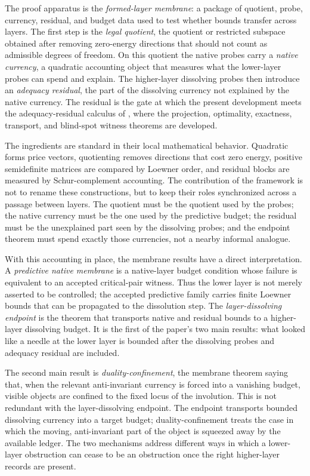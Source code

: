 \documentclass[11pt]{article}
\theoremstyle{definition}
\begin{document}
The proof apparatus is the \emph{formed-layer membrane}: a package of
quotient, probe, currency, residual, and budget data used to test
whether bounds transfer across layers.  The first step is the
\emph{legal quotient}, the quotient or restricted subspace obtained
after removing zero-energy directions that should not count as
admissible degrees of freedom.  On this quotient the native probes carry
a \emph{native currency}, a quadratic accounting object that measures
what the lower-layer probes can spend and explain.  The higher-layer
dissolving probes then introduce an \emph{adequacy residual}, the part
of the dissolving currency not explained by the native currency.  The
residual is the gate at which the present development meets the
adequacy-residual calculus of \citet{Tsiokos2026XiCompanion}, where the
projection, optimality, exactness, transport, and blind-spot witness
theorems are developed.

The ingredients are standard in their local mathematical behavior.
Quadratic forms price vectors, quotienting removes directions that cost
zero energy, positive semidefinite matrices are compared by Loewner
order, and residual blocks are measured by Schur-complement accounting.
The contribution of the framework is not to rename these constructions,
but to keep their roles synchronized across a passage between layers.
The quotient must be the quotient used by the probes; the native
currency must be the one used by the predictive budget; the residual
must be the unexplained part seen by the dissolving probes; and the
endpoint theorem must spend exactly those currencies, not a nearby
informal analogue.

With this accounting in place, the membrane results have a direct
interpretation.  A \emph{predictive native membrane} is a native-layer
budget condition whose failure is equivalent to an accepted
critical-pair witness.  Thus the lower layer is not merely asserted to
be controlled; the accepted predictive family carries finite Loewner
bounds that can be propagated to the dissolution step.  The
\emph{layer-dissolving endpoint} is the theorem that transports native
and residual bounds to a higher-layer dissolving budget.  It is the
first of the paper's two main results: what looked like a needle at the
lower layer is bounded after the dissolving probes and adequacy residual
are included.

The second main result is \emph{duality-confinement}, the membrane
theorem saying that, when the relevant anti-invariant currency is
forced into a vanishing budget, visible objects are confined to the
fixed locus of the involution.  This is not redundant with the
layer-dissolving endpoint.  The endpoint transports bounded dissolving
currency into a target budget; duality-confinement treats the case in
which the moving, anti-invariant part of the object is squeezed away by
the available ledger.  The two mechanisms address different ways in
which a lower-layer obstruction can cease to be an obstruction once the
right higher-layer records are present.
\end{document}
